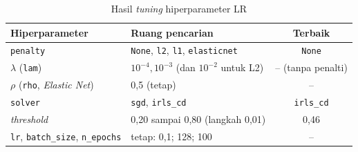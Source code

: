\begin{table}[H]
	\centering
	\caption{Hasil \textit{tuning} hiperparameter LR}
	\label{tab:lr-tuning}
	\begin{tabular}{l l c}
		\toprule
		\textbf{Hiperparameter} & \textbf{Ruang pencarian} & \textbf{Terbaik} \\
		\midrule
		\texttt{penalty} & \texttt{None}, \texttt{l2}, \texttt{l1}, \texttt{elasticnet} & \texttt{None} \\
		$\lambda$ (\texttt{lam}) & $10^{-4}, 10^{-3}$ (dan $10^{-2}$ untuk L2) & -- (tanpa penalti) \\
		$\rho$ (\texttt{rho}, \textit{Elastic Net}) & 0,5 (tetap) & -- \\
		\texttt{solver} & \texttt{sgd}, \texttt{irls\_cd} & \texttt{irls\_cd} \\
		\textit{threshold} & 0,20 sampai 0,80 (langkah 0,01) & 0,46 \\
		\texttt{lr}, \texttt{batch\_size}, \texttt{n\_epochs} & tetap: 0,1; 128; 100 & -- \\
		\bottomrule
	\end{tabular}
\end{table}

